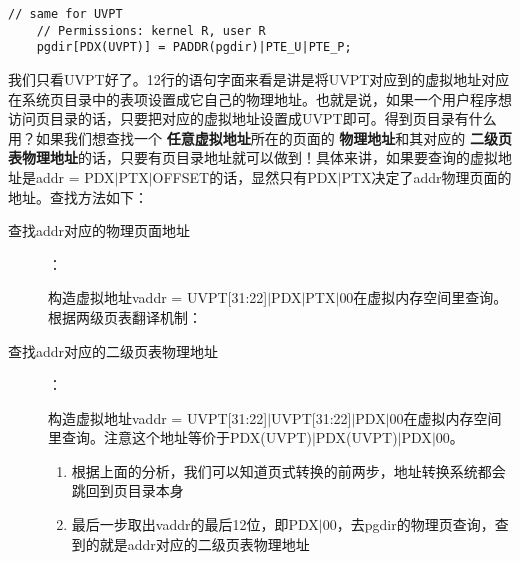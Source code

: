 \documentclass{article}
\newcommand{\highlight}[1]{{\bfseries \color{red}  #1}}
\begin{document}
\begin{CJK*}{UTF8}{gkai}
\begin{description}
\begin{lstlisting}[style=ccode, title={\scriptsize \ttfamily \bfseries kern/pmap.c: i386\_vm\_init ()}]
    // same for UVPT
    // Permissions: kernel R, user R 
    pgdir[PDX(UVPT)] = PADDR(pgdir)|PTE_U|PTE_P;
\end{lstlisting}

我们只看UVPT好了。12行的语句字面来看是讲是将UVPT对应到的虚拟地址对应在系统页目录中的表项设置成它自己的物理地址。也就是说，如果一个用户程序想访问页目录的话，只要把对应的虚拟地址设置成UVPT即可。得到页目录有什么用？如果我们想查找一个\highlight{任意虚拟地址}所在的页面的\highlight{物理地址}和其对应的\highlight{二级页表物理地址}的话，只要有页目录地址就可以做到！具体来讲，如果要查询的虚拟地址是addr = PDX$\left|\right.$PTX$\left|\right.$OFFSET的话，显然只有PDX$\left|\right.$PTX决定了addr物理页面的地址。查找方法如下：

\begin{description}
\item[查找addr对应的物理页面地址]：\newline
{构造虚拟地址vaddr = UVPT[31:22]$\left|\right.$PDX$\left|\right.$PTX$\left|\right.$00在虚拟内存空间里查询。根据两级页表翻译机制：
}
\item[查找addr对应的二级页表物理地址]：\newline
{构造虚拟地址vaddr = UVPT[31:22]$\left|\right.$UVPT[31:22]$\left|\right.$PDX$\left|\right.$00在虚拟内存空间里查询。注意这个地址等价于PDX(UVPT)$\left|\right.$PDX(UVPT)$\left|\right.$PDX$\left|\right.$00。
\begin{enumerate}
\item{根据上面的分析，我们可以知道页式转换的前两步，地址转换系统都会跳回到页目录本身}
\item{最后一步取出vaddr的最后12位，即PDX$\left|\right.$00，去pgdir的物理页查询，查到的就是addr对应的二级页表物理地址}
\end{enumerate}
}
\end{description}


\end{description}
\end{CJK*}
\end{document}
